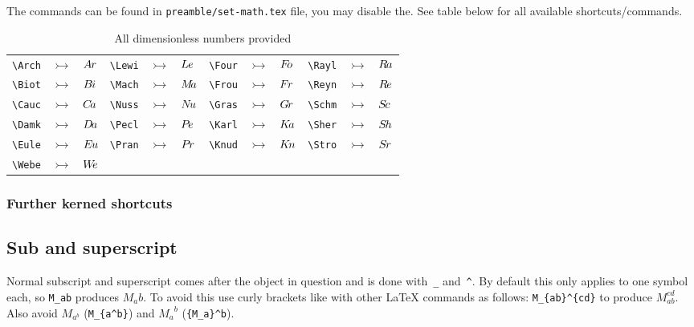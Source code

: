         The commands can be found in \texttt{preamble/set-math.tex} file, you may disable the. See table below for all available shortcuts/commands.

        \begin{table}[H]
            \centering
            \caption{All dimensionless numbers provided}
            \begin{tabular}{lll|lll|lll|lll}
                \verb|\Arch| & $\rightarrowtail $ & ${A\kern-.06em r}$ &
                  \verb|\Lewi| & $\rightarrowtail $ & ${L\kern-.05em e}$ &
                  \verb|\Four| & $\rightarrowtail $ & ${F\kern-.20em o}$ &
                  \verb|\Rayl| & $\rightarrowtail $ & ${R\kern-.10em a}$ \\
                \verb|\Biot| & $\rightarrowtail $ & ${B\kern-.08em i}$ &
                  \verb|\Mach| & $\rightarrowtail $ & ${M\kern-.20em a}$ &
                  \verb|\Frou| & $\rightarrowtail $ & ${F\kern-.07em r}$ &
                  \verb|\Reyn| & $\rightarrowtail $ & ${R\kern-.10em e}$ \\
                \verb|\Cauc| & $\rightarrowtail $ & ${C\kern-.13em a}$ &
                  \verb|\Nuss| & $\rightarrowtail $ & ${N\kern-.15em u}$ &
                  \verb|\Gras| & $\rightarrowtail $ & ${G\kern-.12em r}$ &
                  \verb|\Schm| & $\rightarrowtail $ & ${S\kern-.12em c}$ \\
                \verb|\Damk| & $\rightarrowtail $ & ${D\kern-.12em a}$ &
                  \verb|\Pecl| & $\rightarrowtail $ & ${P\kern-.15em e}$ &
                  \verb|\Karl| & $\rightarrowtail $ & ${K\kern-.15em a}$ &
                  \verb|\Sher| & $\rightarrowtail $ & ${S\kern-.12em h}$ \\
                \verb|\Eule| & $\rightarrowtail $ & ${E\kern-.09em u}$ &
                  \verb|\Pran| & $\rightarrowtail $ & ${P\kern-.10em r}$ &
                  \verb|\Knud| & $\rightarrowtail $ & ${K\kern-.13em n}$ &
                  \verb|\Stro| & $\rightarrowtail $ & ${S\kern-.09em r}$ \\
                \verb|\Webe| & $\rightarrowtail $ & ${W\kern-.25em e}$ &
                  &&&&&&&&
            \end{tabular}
        \end{table}

    \subsubsection{Further kerned shortcuts}


\subsection{Sub and superscript}
    Normal subscript and superscript comes after the object in question and is done with~\texttt{\_} and~\texttt{\^}. By default this only applies to one symbol each, so \verb|M_ab| produces $M_ab$. To avoid this use curly brackets like with other \LaTeX{} commands as follows: \verb|M_{ab}^{cd}| to produce $M_{ab}^{cd}$. Also avoid $M_{a^b}$ (\verb*|M_{a^b}|) and ${M_a}^b$ (\verb*|{M_a}^b|).

